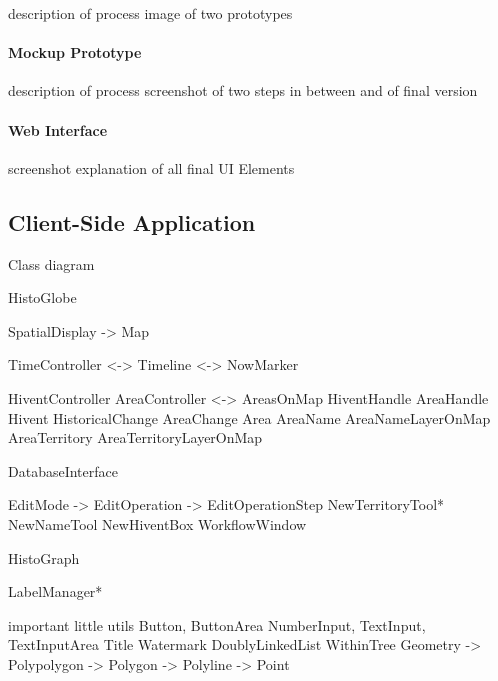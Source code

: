 description of process
image of two prototypes


\paragraph{Mockup Prototype} %
\label{par:mockup_prototype}

description of process
screenshot of two steps in between and of final version


\paragraph{Web Interface} %
\label{sub:final_version}

screenshot
explanation of all final UI Elements




\subsection{Client-Side Application} %
\label{sub:client_side_application}

Class diagram

HistoGlobe

SpatialDisplay -> Map

TimeController  <-> Timeline
                <-> NowMarker

HiventController                AreaController <->  AreasOnMap
HiventHandle                    AreaHandle
Hivent
HistoricalChange    AreaChange  Area
                                AreaName            AreaNameLayerOnMap
                                AreaTerritory       AreaTerritoryLayerOnMap

DatabaseInterface

EditMode -> EditOperation -> EditOperationStep
NewTerritoryTool* NewNameTool NewHiventBox
WorkflowWindow

HistoGraph

LabelManager*

important little utils
  Button, ButtonArea
  NumberInput, TextInput, TextInputArea
  Title
  Watermark
  DoublyLinkedList
  WithinTree
  Geometry -> Polypolygon -> Polygon -> Polyline -> Point


